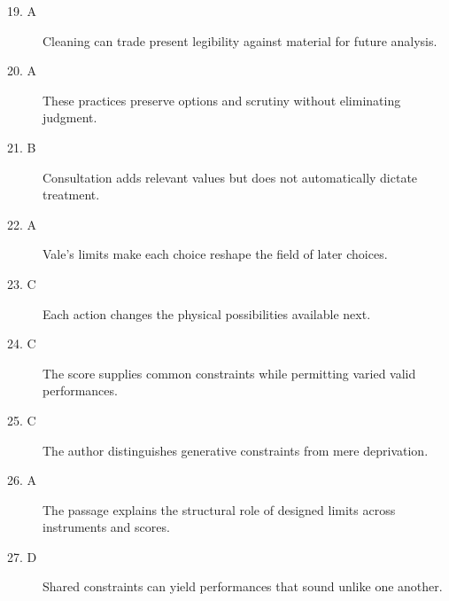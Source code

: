 \begin{description}
\item[19. A] Cleaning can trade present legibility against material for future analysis.
\item[20. A] These practices preserve options and scrutiny without eliminating judgment.
\item[21. B] Consultation adds relevant values but does not automatically dictate treatment.
\item[22. A] Vale's limits make each choice reshape the field of later choices.
\item[23. C] Each action changes the physical possibilities available next.
\item[24. C] The score supplies common constraints while permitting varied valid performances.
\item[25. C] The author distinguishes generative constraints from mere deprivation.
\item[26. A] The passage explains the structural role of designed limits across instruments and scores.
\item[27. D] Shared constraints can yield performances that sound unlike one another.
\end{description}
